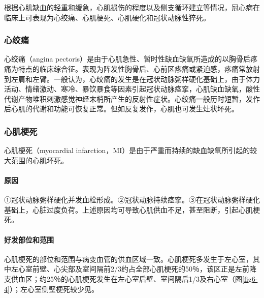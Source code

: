 根据心肌缺血的轻重和缓急，心肌损伤的程度以及侧支循环建立等情况，冠心病在临床上可表现为心绞痛、心肌梗死、心肌硬化和冠状动脉性猝死。

\subsubsection{心绞痛}

心绞痛（angina
pectoris）是由于心肌急性、暂时性缺血缺氧所造成的以胸骨后疼痛为特点的临床综合征。表现为阵发性胸骨后、心前区疼痛或紧迫感，疼痛常放射到左肩和左臂。一般认为，心绞痛的发生是在冠状动脉粥样硬化基础上，由于体力活动、情绪激动、寒冷、暴饮暴食等因素引起冠状动脉痉挛，心肌缺血缺氧，酸性代谢产物堆积刺激感觉神经末梢所产生的反射性症状。心绞痛一般历时短暂，发作后心肌的代谢和功能可恢复正常。但如反复发作，心肌也可发生灶状坏死。

\subsubsection{心肌梗死}

心肌梗死（myocardial
infarction，MI）是由于严重而持续的缺血缺氧所引起的较大范围的心肌坏死。

\paragraph{原因}
①冠状动脉粥样硬化并发血栓形成。②冠状动脉持续痉挛。③在冠状动脉粥样硬化基础上，心脏过度负荷。上述原因均可导致心肌供血不足，甚至阻断，引起心肌梗死。

\paragraph{好发部位和范围}
心肌梗死的部位和范围与病变血管的供血区域一致。心肌梗死多发生于左心室，其中左心室前壁、心尖部及室间隔前2/3约占全部心肌梗死的50％，该区正是左前降支供血区；约25％的心肌梗死发生在左心室后壁、室间隔后1/3及右心室（图\ref{fig6-4}）；左心室侧壁梗死较少见。

